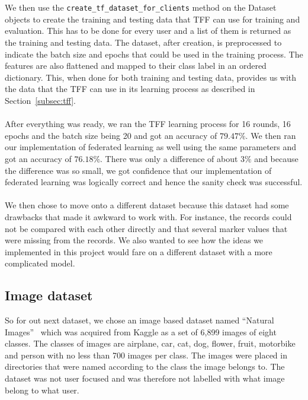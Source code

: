 \documentclass[12pt]{article}
\begin{document}
\\\\
We then use the \texttt{create\_tf\_dataset\_for\_clients} method on the Dataset objects to create the training and testing data that TFF can use for training and evaluation. This has to be done for every user and a list of them is returned as the training and testing data. The dataset, after creation, is preprocessed to indicate the batch size and epochs that could be used in the training process. The features are also flattened and mapped to their class label in an ordered dictionary. This, when done for both training and testing data, provides us with the data that the TFF can use in its learning process as described in Section~\ref{subsec:tff}.
\\\\
After everything was ready, we ran the TFF learning process for 16 rounds, 16 epochs and the batch size being 20 and got an accuracy of $79.47\%$. We then ran our implementation of federated learning as well using the same parameters and got an accuracy of $76.18\%$. There was only a difference of about $3\%$ and because the difference was so small, we got confidence that our implementation of federated learning was logically correct and hence the sanity check was successful. 
\\\\
We then chose to move onto a different dataset because this dataset had some drawbacks that made it awkward to work with. For instance, the records could not be compared with each other directly and that several marker values that were missing from the records. We also wanted to see how the ideas we implemented in this project would fare on a different dataset with a more complicated model.
\subsection{Image dataset}\label{subsec:imageset}
So for out next dataset, we chose an image based dataset named ``Natural Images''~\cite{roy2018effects} which was acquired from Kaggle as a set of 6,899 images of eight classes. The classes of images are airplane, car, cat, dog, flower, fruit, motorbike and person with no less than 700 images per class. The images were placed in directories that were named according to the class the image belongs to. The dataset was not user focused and was therefore not labelled with what image belong to what user.
\end{document}
